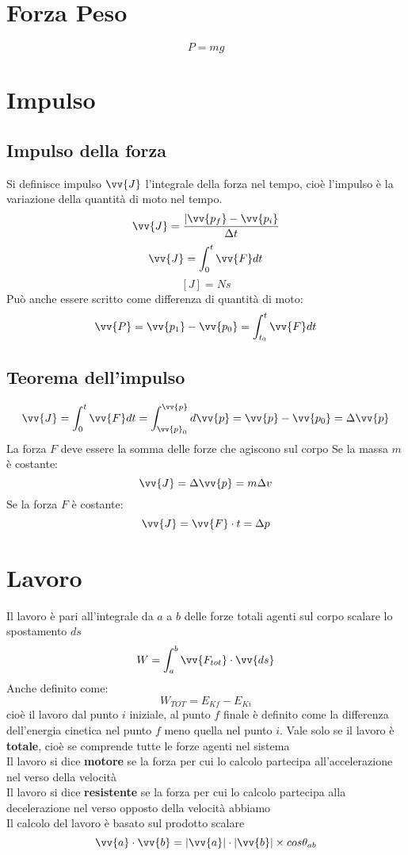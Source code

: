 \documentclass[a4paper]{report}
\begin{document}
  \section{Forza Peso}
  $$ P = mg $$

  \section{Impulso}
  \subsection{Impulso della forza}
  Si definisce impulso $ \vv{J} $ l'integrale della forza nel tempo, cioè l'impulso è la variazione della quantità di moto nel tempo.
  $$ \vv{J} = \frac{|\vv{p_f} - \vv{p_i}}{\Delta t}$$
  $$ \vv{J} = \int_0^t \vv{F} dt $$
  $$ [J] = N  s $$
  Può anche essere scritto come differenza di quantità di moto:
  $$\vv{P} = \vv{p_1} - \vv{p_0} = \int_{t_0}^t \vv{F} dt $$

  \subsection{Teorema dell'impulso}
  $$ \vv{J} = \int_0^t \vv{F} dt = \int_{\vv{p}_0}^{\vv{p}} d\vv{p} = \vv{p} - \vv{p_0} = \Delta \vv{p} $$
  La forza $F$ deve essere la somma delle forze che agiscono sul corpo 
  Se la massa $m$ è costante:
  $$ \vv{J} = \Delta \vv{p} = m \Delta v $$
  Se la forza $F$ è costante:
  $$ \vv{J} = \vv{F} \cdot t = \Delta p  $$

  \section{Lavoro}
  Il lavoro è pari all'integrale da $a$ a $b$ delle forze totali agenti sul corpo scalare lo spostamento $ds$
  $$ W = \int_{a}^{b} \vv{F_{tot}} \cdot \vv{ds} $$
  Anche definito come:
  $$ W_{TOT} = E_{Kf} - E_{Ki} $$
  cioè il lavoro dal punto $i$ iniziale, al punto $f$ finale è definito come la differenza dell'energia cinetica nel punto $f$ meno quella nel punto $i$. Vale solo se il lavoro è \textbf{totale}, cioè se comprende tutte le forze agenti nel sistema\\
  Il lavoro si dice \textbf{motore} se la forza per cui lo calcolo partecipa all'accelerazione nel verso della velocità\\
  Il lavoro si dice \textbf{resistente} se la forza per cui lo calcolo partecipa alla decelerazione nel verso opposto della velocità
  abbiamo\\
  Il calcolo del lavoro è basato sul prodotto scalare $$\vv{a} \cdot \vv{b} = |\vv{a}| \cdot |\vv{b}| \times cos \theta_{ab}$$
\end{document}
